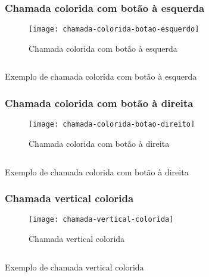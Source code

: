 \subsubsection{Chamada colorida com botão à esquerda}

\begin{figure}[!ht]
    \centering
    \texttt{[image: chamada-colorida-botao-esquerdo]}
    \caption{Chamada colorida com botão à esquerda}\label{RS0001:fig:chamada-colorida-botao-esquerdo}
\end{figure}

\begin{code}
    \inputminted[label=chamada-colorida-botao-esquerdo.html]{html}{../RS0001/anexos/chamada-colorida-botao-esquerdo.html}
    \caption{Exemplo de chamada colorida com botão à esquerda}\label{RS0001:code:exemplo-chamada-colorida-botao-esquerdo}
\end{code}


\subsubsection{Chamada colorida com botão à direita}

\begin{figure}[!ht]
    \centering
    \texttt{[image: chamada-colorida-botao-direito]}
    \caption{Chamada colorida com botão à direita}\label{RS0001:fig:chamada-colorida-botao-direito}
\end{figure}

\begin{code}
    \inputminted[label=chamada-colorida-botao-direito.html]{html}{../RS0001/anexos/chamada-colorida-botao-direito.html}
    \caption{Exemplo de chamada colorida com botão à direita}\label{RS0001:code:exemplo-chamada-colorida-botao-direito}
\end{code}


\subsubsection{Chamada vertical colorida}

\begin{figure}[!ht]
    \centering
    \texttt{[image: chamada-vertical-colorida]}
    \caption{Chamada vertical colorida}\label{RS0001:fig:chamada-vertical-colorida}
\end{figure}

\begin{code}
    \inputminted[label=chamada-vertical-colorida.html]{html}{../RS0001/anexos/chamada-vertical-colorida.html}
    \caption{Exemplo de chamada vertical colorida}\label{RS0001:code:exemplo-chamada-vertical-colorida}
\end{code}


